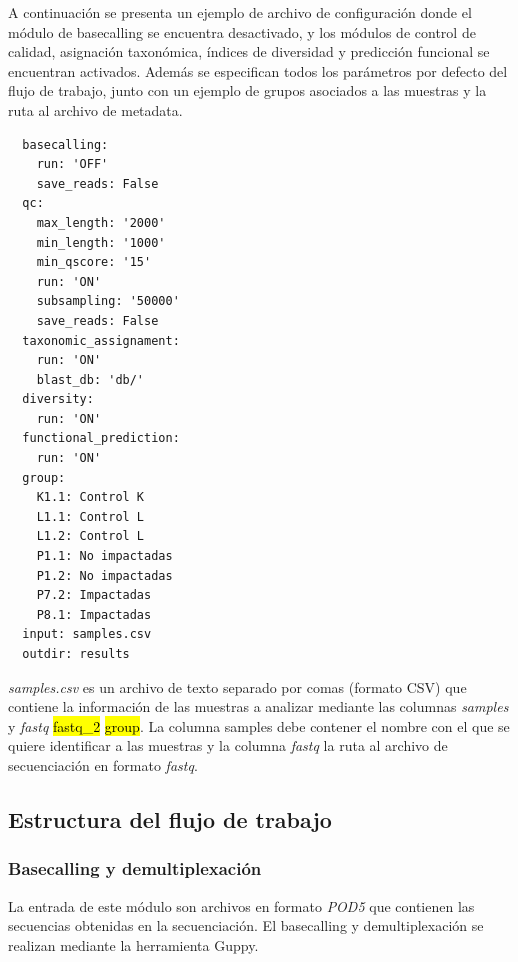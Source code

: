 A continuación se presenta un ejemplo de archivo de configuración donde el módulo de basecalling se encuentra desactivado, y los módulos de control de calidad, asignación taxonómica, índices de diversidad y predicción funcional se encuentran activados.
Además se especifican todos los parámetros por defecto del flujo de trabajo, junto con un ejemplo de grupos asociados a las muestras y la ruta al archivo de metadata.




\begin{verbatim}
  basecalling:
    run: 'OFF'
    save_reads: False
  qc:
    max_length: '2000'
    min_length: '1000'
    min_qscore: '15'
    run: 'ON'
    subsampling: '50000'
    save_reads: False
  taxonomic_assignament:
    run: 'ON'
    blast_db: 'db/'
  diversity:
    run: 'ON'
  functional_prediction:
    run: 'ON'
  group:
    K1.1: Control K
    L1.1: Control L
    L1.2: Control L
    P1.1: No impactadas
    P1.2: No impactadas
    P7.2: Impactadas
    P8.1: Impactadas
  input: samples.csv
  outdir: results
\end{verbatim}
\label{verb:config}

\textit{samples.csv} es un archivo de texto separado por comas (formato CSV) que contiene la información de las muestras a analizar mediante las columnas \textit{samples} y \textit{fastq} \hl{fastq\_2} \hl{group}. 
La columna samples debe contener el nombre con el que se quiere identificar a las muestras y la columna \textit{fastq} la ruta al archivo de secuenciación en formato \textit{fastq}.

\subsection{Estructura del flujo de trabajo}

\subsubsection{Basecalling y demultiplexación}
La entrada de este módulo son archivos en formato \textit{POD5} que contienen las secuencias obtenidas en la secuenciación.
El basecalling y demultiplexación se realizan mediante la herramienta Guppy.

